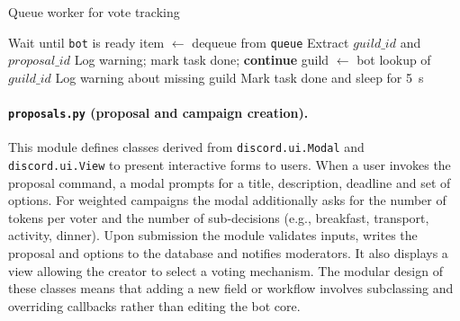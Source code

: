 \begin{algorithm}
    \caption{Queue worker for vote tracking}\label{alg:queue_worker}
    \begin{algorithmic}[1]
            \State Wait until \texttt{bot} is ready
                \State item $\leftarrow$ dequeue from \texttt{queue}
                \State Extract $guild\_id$ and $proposal\_id$
                    \State Log warning; mark task done; \textbf{continue}
                \EndIf
                \State guild $\leftarrow$ bot lookup of $guild\_id$
                    \State {}
                \Else
                    \State Log warning about missing guild
                \EndIf
                \State Mark task done and sleep for 5~s
            \EndWhile
        \EndProcedure
    \end{algorithmic}
\end{algorithm}

\paragraph{\texttt{proposals.py} (proposal and campaign creation).}
This module defines classes derived from \texttt{discord.ui.Modal} and
\texttt{discord.ui.View} to present interactive forms to users.  When a
user invokes the proposal command, a modal prompts for a title,
description, deadline and set of options.  For weighted campaigns the
modal additionally asks for the number of tokens per voter and the
number of sub‑decisions (e.g., breakfast, transport, activity, dinner).
Upon submission the module validates inputs, writes the proposal and
options to the database and notifies moderators.  It also displays a
view allowing the creator to select a voting mechanism.  The modular
design of these classes means that adding a new field or workflow
involves subclassing and overriding callbacks rather than editing the
bot core.

